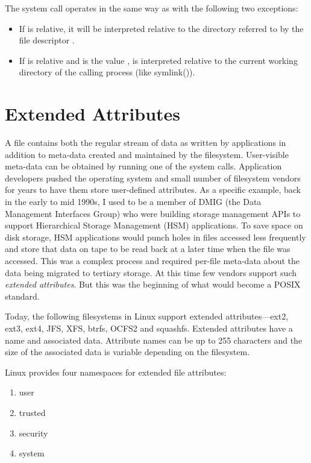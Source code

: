 \noindent
The  system call operates in the same way as  with the following two exceptions:

\begin{itemize}
	\item If  is relative, it will be interpreted relative to the directory referred to by the file descriptor .
	\item If   is relative and  is the value ,  is interpreted relative to the 
		current working directory of the calling process (like symlink()).
\end{itemize}


\section{Extended Attributes}

A file contains both the regular stream of data as written by applications in addition to meta-data created and maintained by the filesystem. User-visible meta-data can be obtained by running one of the  system calls. Application developers pushed the operating system and small number of filesystem vendors for years to have them store user-defined attributes. As a specific example, back in the early to mid 1990s, I used to be a member of DMIG (the Data Management Interfaces Group) who were building storage management APIs to support Hierarchical Storage Management (HSM) applications. To save space on disk storage, HSM applications would punch holes in files accessed less frequently and store that data on tape to be read back at a later time when the file was accessed. This was a complex process and required per-file meta-data about the data being migrated to tertiary storage. At this time few vendors support such \textit{extended attributes}. But this was the beginning of what would become a POSIX standard. 

Today, the following filesystems in Linux support extended attributes---ext2, ext3, ext4, JFS, XFS, btrfs, OCFS2 and squashfs. Extended attributes have a name and associated data. Attribute names can be up to 255 characters and the size of the associated data is variable depending on the filesystem.

Linux provides four namespaces for extended file attributes:

\begin{enumerate}
	\item user
	\item trusted
	\item security
	\item system
\end{enumerate}

